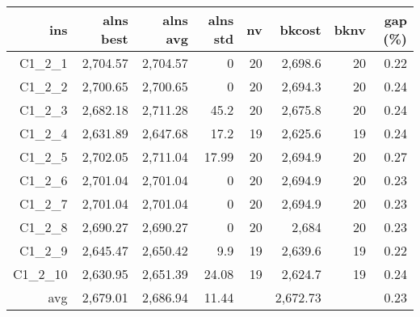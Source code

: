   \begin{table}[caption={Kết quả đo với tập HG\_C\_1\_2 200 yêu cầu}, label=exp:HGC12]
      \small
      \centering
      \begin{tabular}{rrrrrrrr}
        \hline
        ins & alns best & alns avg & alns std & nv & bkcost & bknv & gap (\%) \\ \hline
        C1\_2\_1 & 2,704.57 & 2,704.57 & 0 & 20 & 2,698.6 & 20 & 0.22 \\ \hline
        C1\_2\_2 & 2,700.65 & 2,700.65 & 0 & 20 & 2,694.3 & 20 & 0.24 \\ \hline
        C1\_2\_3 & 2,682.18 & 2,711.28 & 45.2 & 20 & 2,675.8 & 20 & 0.24 \\ \hline
        C1\_2\_4 & 2,631.89 & 2,647.68 & 17.2 & 19 & 2,625.6 & 19 & 0.24 \\ \hline
        C1\_2\_5 & 2,702.05 & 2,711.04 & 17.99 & 20 & 2,694.9 & 20 & 0.27 \\ \hline
        C1\_2\_6 & 2,701.04 & 2,701.04 & 0 & 20 & 2,694.9 & 20 & 0.23 \\ \hline
        C1\_2\_7 & 2,701.04 & 2,701.04 & 0 & 20 & 2,694.9 & 20 & 0.23 \\ \hline
        C1\_2\_8 & 2,690.27 & 2,690.27 & 0 & 20 & 2,684 & 20 & 0.23 \\ \hline
        C1\_2\_9 & 2,645.47 & 2,650.42 & 9.9 & 19 & 2,639.6 & 19 & 0.22 \\ \hline
        C1\_2\_10 & 2,630.95 & 2,651.39 & 24.08 & 19 & 2,624.7 & 19 & 0.24 \\ \hline
        avg & 2,679.01 & 2,686.94 & 11.44 & & 2,672.73 & & 0.23 \\ \hline
      \end{tabular}
  \end{table}
    
